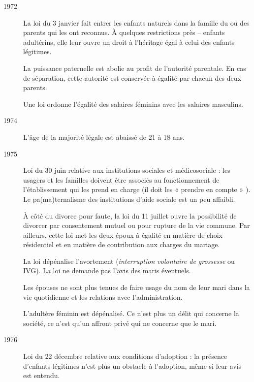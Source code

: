 \begin{description}
\item[1972] La loi du 3 janvier fait entrer les enfants naturels dans la famille du ou des parents qui les ont reconnus. À quelques restrictions près -- enfants adultérins, elle leur ouvre un droit à l'héritage égal à celui des enfants légitimes.

La puissance paternelle est abolie au profit de l'autorité parentale. En cas de séparation, cette autorité est conservée à égalité par chacun des deux parents. 

Une loi ordonne l'égalité des salaires féminins avec les salaires masculins.

\item[1974] L'âge de la majorité légale est abaissé de 21 à 18 ans. 

\item[1975] Loi du 30 juin relative aux institutions sociales et médicosociale : les usagers et les familles doivent être associés au fonctionnement de l'établissement qui les prend en charge (il doit les « prendre en compte » ).  Le pa(ma)ternalisme des institutions d'aide sociale est un peu affaibli.

À côté du divorce pour faute, la loi du 11 juillet ouvre la possibilité de divorcer par consentement mutuel ou pour rupture de la vie commune. Par ailleurs, cette loi met les deux époux à égalité en matière de choix résidentiel et en matière de contribution aux charges du mariage.

La loi  dépénalise l'avortement (\emph{interruption volontaire de grossesse} ou IVG). La loi ne demande pas l'avis des maris éventuels.

Les épouses ne sont plus tenues de faire usage du nom de leur mari dans la vie quotidienne et les relations avec l'administration.

L'adultère féminin est dépénalisé. Ce n'est plus un délit qui concerne la société, ce n'est qu'un affront privé qui ne concerne que le mari.

\item[1976] Loi du 22 décembre relative aux conditions d'adoption : la présence d'enfants légitimes n'est plus un obstacle à l'adoption, même si leur avis est entendu. 


\end{description}
